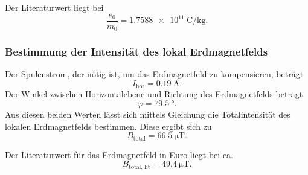 \noindent Der Literaturwert liegt bei 
\begin{equation*}
    \frac{e_0}{m_0} = \SI{1.7588e11}{\coulomb\per\kilo\gram}.
\end{equation*}

\subsubsection{Bestimmung der Intensität des lokal Erdmagnetfelds}
Der Spulenstrom, der nötig ist, um das Erdmagnetfeld zu
kompensieren, beträgt
\begin{equation*}
    I_\text{hor} = \SI{0.19}{\ampere}.
\end{equation*}
Der Winkel zwischen Horizontalebene und Richtung des Erdmagnetfelds
beträgt
\begin{equation*}
    \varphi = \SI{79.5}{\degree}.
\end{equation*}
Aus diesen beiden Werten lässt sich mittels Gleichung %
die Totalintensität des lokalen Erdmagnetfelds bestimmen.
Diese ergibt sich zu
\begin{equation*}
    B_\text{total} = \SI{66.5}{\micro\tesla}.
\end{equation*}

\noindent Der Literaturwert für das Erdmagnetfeld in Euro liegt bei ca.
\begin{equation*}
    B_\text{total, lit} = \SI{49.4}{\micro\tesla}.
\end{equation*} %
